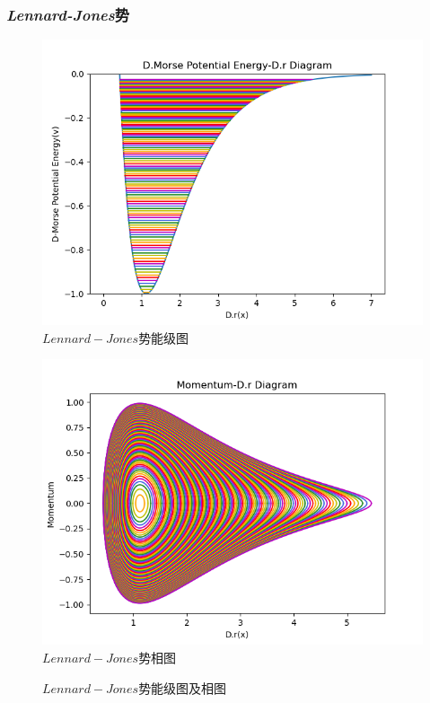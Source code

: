 \documentclass[11pt, a4paper, oneside]{ctexart}
\begin{document}
{{{\begin{appendices}
{        \subsubsection{\emph{Lennard-Jones}势}
        {\newpage
            \begin{figure}[!ht]
                \caption{ $Lennard-Jones$势能级图}
                \centering
                \includegraphics[scale=0.75]{021.png}
            \end{figure} 
            \begin{figure}[!ht]
                \caption{ $Lennard-Jones$势相图}
        
                \centering
                \includegraphics[scale=0.75]{022.png}
            \end{figure} 
            \begin{figure}[!ht]
                \caption{ $Lennard-Jones$势能级图及相图}
        

\end{figure}}}
\end{appendices}}}}
\end{document}
